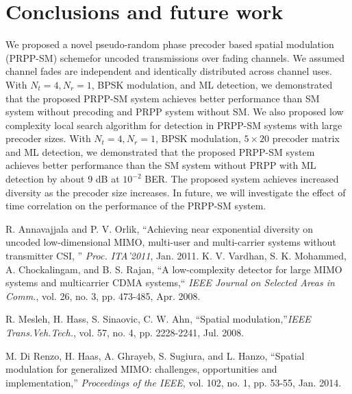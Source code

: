 \documentclass[11pt, onecolumn]{report}
\begin{document}
   
   \chapter{Conclusions and future work}
   
   We proposed a novel pseudo-random phase precoder based spatial modulation (PRPP-SM)  schemefor uncoded transmissions over fading channels. We assumed channel fades are independent and identically distributed across channel uses. With $N_t=4,N_r=1$, BPSK modulation, and ML detection, we demonstrated that the proposed PRPP-SM system achieves better performance than SM system without precoding and PRPP system without SM. We also proposed low complexity local search algorithm for detection in PRPP-SM systems  with large precoder sizes.
   With $N_t=4, N_r=1$, BPSK modulation, $5\times20$ precoder matrix and ML detection, we demonstrated that the proposed PRPP-SM system achieves better performance than the SM system without PRPP with ML detection by about 9 dB at $10^{-2}$ BER. The proposed system achieves increased diversity as the precoder size increases. In future, we will investigate the effect of time correlation on the performance of the PRPP-SM system.
   
  

 \begin{thebibliography}{99}
\vspace{0mm}

R. Annavajjala and P. V. Orlik, ``Achieving near exponential diversity on uncoded low-dimensional MIMO, multi-user and multi-carrier systems without transmitter CSI, '' \textit{ Proc. ITA'2011}, Jan. 2011.
 K. V. Vardhan, S. K. Mohammed, A. Chockalingam, and B. S. Rajan,
``A low-complexity detector for large MIMO systems and multicarrier
CDMA systems,``\textit{ IEEE Journal on Selected Areas in Comm.}, vol. 26,
no. 3, pp. 473-485, Apr. 2008.

 R. Mesleh, H. Hass, S. Sinaovic, C. W. Ahn, ``Spatial modulation,''\textit{IEEE Trans.Veh.Tech.}, vol. 57, no. 4, pp. 2228-2241, Jul. 2008.
 
 M. Di Renzo, H. Haas, A. Ghrayeb, S. Sugiura, and L. Hanzo, ``Spatial
modulation for generalized MIMO: challenges, opportunities and 
implementation,'' {\em Proceedings of the IEEE}, vol. 102, no. 1, pp. 53-55, Jan. 2014. 




\end{thebibliography}      
      
\end{document}
